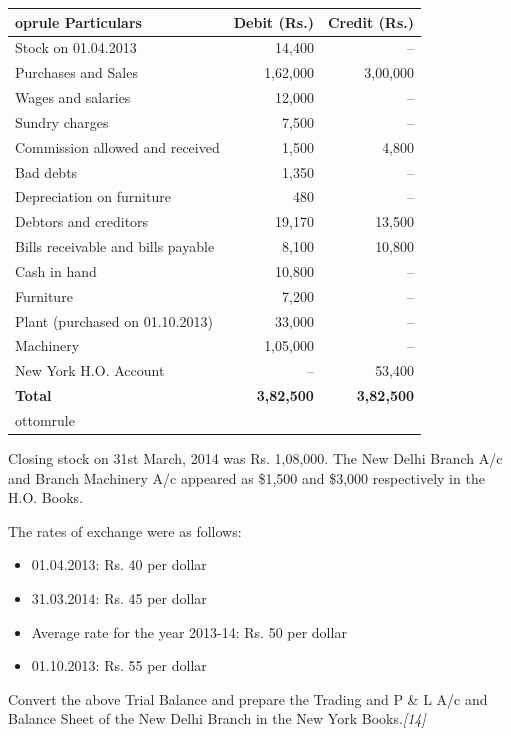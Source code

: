 \documentclass[11pt,a4paper]{article}
\newcommand{\pts}[1]{\hfill   \textit{[#1]}}
\begin{document}
\begin{center}
  \small
  
\begin{tabular}{lrr}
     oprule
   \textbf{Particulars} &   \textbf{Debit (Rs.)} &   \textbf{Credit (Rs.)} \\
    \midrule
    Stock on 01.04.2013 & 14,400 & -- \\
    Purchases and Sales & 1,62,000 & 3,00,000 \\
    Wages and salaries & 12,000 & -- \\
    Sundry charges & 7,500 & -- \\
    Commission allowed and received & 1,500 & 4,800 \\
    Bad debts & 1,350 & -- \\
    Depreciation on furniture & 480 & -- \\
    Debtors and creditors & 19,170 & 13,500 \\
    Bills receivable and bills payable & 8,100 & 10,800 \\
    Cash in hand & 10,800 & -- \\
    Furniture & 7,200 & -- \\
    Plant (purchased on 01.10.2013) & 33,000 & -- \\
    Machinery & 1,05,000 & -- \\
    New York H.O. Account & -- & 53,400 \\
    \midrule
   \textbf{Total} &   \textbf{3,82,500} &   \textbf{3,82,500} \\
    ottomrule
  \end{tabular}
\end{center}

Closing stock on 31st March, 2014 was Rs. 1,08,000. The New Delhi Branch A/c and Branch Machinery A/c appeared as \$1,500 and \$3,000 respectively in the H.O. Books.

The rates of exchange were as follows:

\begin{itemize}
  \item 01.04.2013: Rs. 40 per dollar
  \item 31.03.2014: Rs. 45 per dollar
  \item Average rate for the year 2013-14: Rs. 50 per dollar
  \item 01.10.2013: Rs. 55 per dollar
\end{itemize}
Convert the above Trial Balance and prepare the Trading and P \& L A/c and Balance Sheet of the New Delhi Branch in the New York Books.\pts{14}
\end{document}
